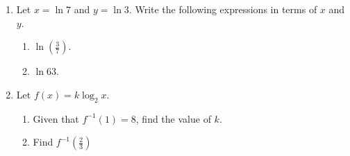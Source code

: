 \documentclass[12pt, oneside]{article}
\begin{document}
\begin{enumerate}
\item Let $x=\ln 7$ and $y= \ln 3$. Write the following expressions in terms of $x$ and $y$.
\begin{enumerate}
    \item $\ln \left( \frac{3}{7} \right)$.
        \begin{flushright}[2]\end{flushright}
    \item $\ln 63$.
        \begin{flushright}[4]\end{flushright}
\end{enumerate}


\item Let $f(x)= k \log_2 x$.
\begin{enumerate}
    \item Given that $f^{-1}(1) = 8$, find the value of $k$.
        \begin{flushright}[3]\end{flushright}
    \item Find $f^{-1}(\frac{2}{3})$
        \begin{flushright}[4]\end{flushright}
\end{enumerate}



\end{enumerate}
\end{document}
